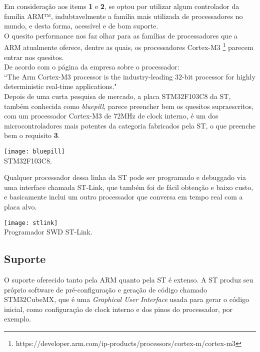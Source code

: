 \documentclass[11pt,a4paper]{report}
\begin{document}
	Em consideração aos items {\bf 1} e {\bf 2}, se optou por utilizar algum controlador da família ARM™, indubtavelmente a família mais utilizada de processadores no mundo, e desta forma, acessível e de bom suporte. \\
	
	O quesito performance nos faz olhar para as famílias de processadores que a ARM atualmente oferece, dentre as quais, os processadores Cortex-M3 \footnote{https://developer.arm.com/ip-products/processors/cortex-m/cortex-m3} parecem entrar nos quesitos. \\
	
	De acordo com o página da empresa sobre o processador:\\
	
	``The Arm Cortex-M3 processor is the industry-leading 32-bit processor for highly deterministic real-time applications."\\
	
	Depois de uma curta pesquisa de mercado, a placa STM32F103C8 da ST, também conhecida como {\it bluepill}, parece preencher bem os quesitos supraescritos, com um processador Cortex-M3 de 72MHz de clock interno, é um dos microcontroladores mais potentes da categoria fabricados pela ST, o que preenche bem o requisito {\bf 3}.\\
	\begin{center}
		\texttt{[image: bluepill]}\\
		\footnotesize{STM32F103C8.}
	\end{center}

	
	Qualquer processador dessa linha da ST pode ser programado e debuggado via uma interface chamada ST-Link, que também foi de fácil obtenção e baixo custo, e basicamente inclui um outro processador que conversa em tempo real com a placa alvo.
	\begin{center}
	\texttt{[image: stlink]}\\
	\footnotesize{Programador SWD ST-Link.}
	\end{center}
	
	\subsection{Suporte}
	O suporte oferecido tanto pela ARM quanto pela ST é extenso. A ST produz seu próprio software de pré-configuração e geração de código chamado STM32CubeMX, que é uma {\it Graphical User Interface} usada para gerar o código inicial, como configuração de clock interno e dos pinos do processador, por exemplo.\\
	
\end{document}
